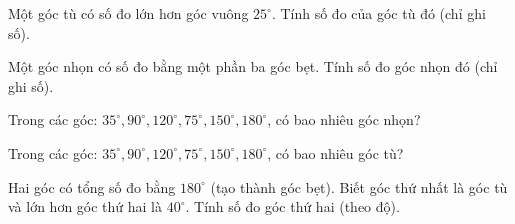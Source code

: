 \begin{ex} %
Một góc tù có số đo lớn hơn góc vuông $25^\circ$. Tính số đo của góc tù đó (chỉ ghi số).
\end{ex}

\begin{ex} %
Một góc nhọn có số đo bằng một phần ba góc bẹt. Tính số đo góc nhọn đó (chỉ ghi số).
\end{ex}

\begin{ex} %
Trong các góc: $35^\circ, 90^\circ, 120^\circ, 75^\circ, 150^\circ, 180^\circ$, có bao nhiêu góc nhọn?
\end{ex}

\begin{ex} %
Trong các góc: $35^\circ, 90^\circ, 120^\circ, 75^\circ, 150^\circ, 180^\circ$, có bao nhiêu góc tù?
\end{ex}

\begin{ex} %
Hai góc có tổng số đo bằng $180^\circ$ (tạo thành góc bẹt). Biết góc thứ nhất là góc tù và lớn hơn góc thứ hai là $40^\circ$. Tính số đo góc thứ hai (theo độ).
\end{ex}
